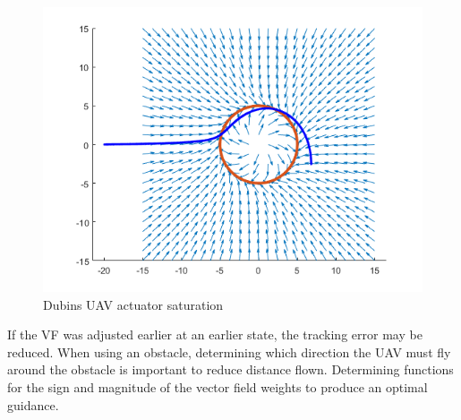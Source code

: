 \documentclass[numbered,pdftex]{ohio-etd}
\begin{document}
\begin{figure}
	\centering
	\includegraphics[width=12cm]{PaperFigures/inputSat}
	\caption{Dubins UAV actuator saturation}
	\label{fig:inputSat}
\end{figure}

If the VF was adjusted earlier at an earlier state, the tracking error may be reduced. When using an obstacle, determining which direction the UAV must fly around the obstacle is important to reduce distance flown. Determining functions for the sign and magnitude of the vector field weights to produce an optimal guidance.




\end{document}

